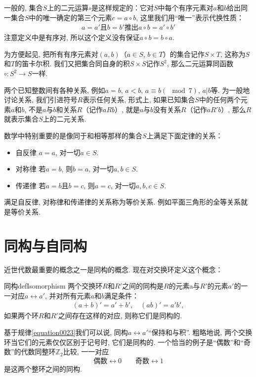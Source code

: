 一般的, 集合$S$上的二元运算$\circ$是这样规定的：它对$S$中每个有序元素对$a$和$b$给出同一集合$S$中的唯一确定的第三个元素$c=a \circ b$, 这里我们用“唯一”表示代换性质：
\begin{gather}\label{equation0022}
a=a'\text{且}b=b'\text{推出}a \circ b = a' \circ b'
\end{gather}
注意定义中是有序对, 所以这个定义没有保证$a \circ b = b \circ a$. 

为方便起见, 把所有有序元素对$(a, b)$（$a \in S$, $b \in T$）的集合记作$S \times T$, 这称为$S$和$T$的笛卡尔积. 我们又把集合同自身的积$S \times S$记作$S^2$, 那么二元运算同函数$\circ: S^2 \to S$一样. 

两个已知整数间有各种关系, 例如$a=b$, $a<b$, $a \equiv b(\mod{7})$, $a|b$等. 为一般地讨论关系, 我们引进符号$R$表示任何关系, 形式上, 如果已知集合$S$中的任何两个元素$a$和$b$, 不是$a$与$b$和关系$R$（记作$aRb$）, 就是$a$与$b$没有关系$R$（记作$aR'b$）, 那么$R$就表示集合$S$上的二元关系. 

数学中特别重要的是像同于和相等那样的集合$S$上满足下面定律的关系：
\begin{itemize}
\item 自反律 $a=a$, 对一切$a \in S$. 
\item 对称律 若$a=b$, 则$b=a$, 对一切$a, b \in S$. 
\item 传递律 若$a=b$且$b=c$, 则$a=c$, 对一切$a, b, c \in S$. 
\end{itemize}
满足自反律, 对称律和传递律的关系称为等价关系. 例如平面三角形的全等关系就是等价关系. 


\section{同构与自同构}\label{section0010112}
近世代数最重要的概念之一是同构的概念. 现在对交换环定义这个概念：
\begin{definition}{同构}{defIsomorphism}
两个交换环$R$和$R'$之间的同构是$R$的元素a与$R'$的元素$a'$的一一对应$a \leftrightarrow a'$, 并对所有元素$a$和$b$满足条件：
\begin{gather}\label{equation0023}
(a+b)'=a'+b',\quad (ab)'=a'b',
\end{gather}
如果两个环$R$和$R'$之间存在这样的对应, 则称它们是同构的. 
\end{definition}
基于规律\ref{equation0023}我们可以说, 同构$a \leftrightarrow a'$“保持和与积”. 粗略地说, 两个交换环当它们的元素仅仅区别于记号时, 它们是同构的. 一个恰当的例子是“偶数”和“奇数”的代数同整环$\mathbb{Z}_2$比较, 一一对应
\[
\text{偶数}\leftrightarrow 0 \quad\quad \text{奇数}\leftrightarrow 1
\]
是这两个整环之间的同构. 

